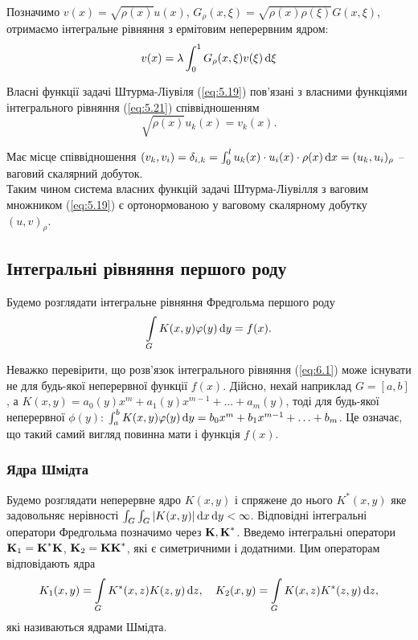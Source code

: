 Позначимо $v(x) = \sqrt{\rho(x)} u(x)$, $G_\rho(x, \xi) = \sqrt{\rho(x)\rho(\xi)} G(x, \xi)$, отримаємо інтегральне рівняння з ермітовим неперервним ядром:
\begin{equation}
	\label{eq:5.21}
	v(x) = \lambda \int_0^1 G_\rho(x, \xi) v(\xi) \diff \xi
\end{equation}

Власні функції задачі Штурма-Ліувіля (\ref{eq:5.19}) пов’язані з власними функціями інтегрального рівняння (\ref{eq:5.21}) співвідношенням
\begin{equation}
	\label{eq:5.22}
	\sqrt{\rho(x)}u_k(x) = v_k(x).
\end{equation}

Має місце співвідношення $(v_k, v_i) = \delta_{i,k} = \int_0^l u_k(x) \cdot u_i(x) \cdot \rho(x) \diff x = (u_k, u_i)_\rho$ -- ваговий скалярний добуток. \\

Таким чином система власних функцій задачі Штурма-Ліувілля з ваговим множником (\ref{eq:5.19}) є ортонормованою у ваговому скалярному добутку $(u, v)_\rho$.

\subsection{Інтегральні рівняння першого роду}

Будемо розглядати інтегральне рівняння Фредгольма першого роду
\begin{equation}
	\label{eq:6.1}
	\Int_G K(x, y) \phi(y) \diff y = f(x).
\end{equation}

Неважко перевірити, що розв’язок інтегрального рівняння (\ref{eq:6.1}) може існувати не для будь-якої неперервної функції $f(x)$. Дійсно, нехай наприклад $G=[a,b]$, а $K(x, y)=a_0(y)x^m+a_1(y)x^{m-1}+\ldots+a_m(y)$, тоді для будь-якої неперервної $\phi(y)$: $\int_a^b K(x, y) \phi(y) \diff y = b_0x^m + b_1x^{m-1}+\ldots+b_m$. Це означає, що такий самий вигляд повинна мати і функція $f(x)$.

\subsubsection{Ядра Шмідта}

Будемо розглядати неперервне ядро $K(x, y)$ і спряжене до нього $K^*(x,y)$ яке задовольняє нерівності $\int_G\int_G|K(x,y)|\diff x\diff y<\infty$. Відповідні інтегральні оператори Фредгольма позначимо через $\bf{K}, \bf{K}^*$. Введемо інтегральні оператори $\bf{K}_1=\bf{K}^*\bf{K}$, $\bf{K}_2=\bf{K}\bf{K}^*$, які є симетричними і додатними. Цим операторам відповідають ядра
\begin{equation}
	\label{eq:6.2}
	K_1(x, y) = \Int_G K^*(x, z) K(z, y) \diff z, \quad K_2(x, y) = \Int_G K(x, z) K^*(z, y) \diff z,
\end{equation}
які називаються ядрами Шмідта. \\

